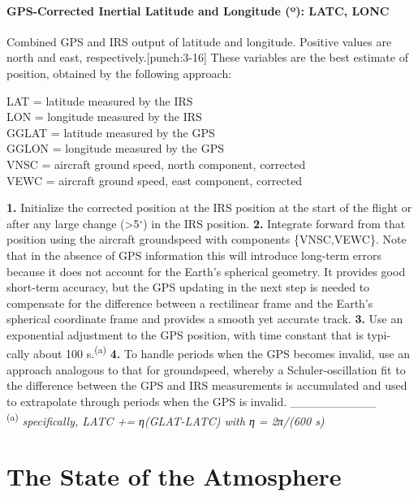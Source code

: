 \documentclass[
  english,
]{book}
\begin{document}
\hypertarget{latc-lonc}{%
\subsubsection*{\texorpdfstring{GPS-Corrected Inertial Latitude and Longitude ({º}): LATC, LONC}{GPS-Corrected Inertial Latitude and Longitude (º): LATC, LONC}}\label{latc-lonc}}

Combined GPS and IRS output of latitude and longitude. Positive values are north and east, respectively.\protect\hypertarget{punch:3-16}{}{{[}punch:3-16{]}} These variables are the best estimate of position, obtained by the following approach:

LAT = latitude measured by the IRS\\
LON = longitude measured by the IRS\\
GGLAT = latitude measured by the GPS\\
GGLON = longitude measured by the GPS\\
VNSC = aircraft ground speed, north component, corrected\\
VEWC = aircraft ground speed, east component, corrected

\textbf{1.} Initialize the corrected position at the IRS position at the start of the flight or after
any large change (\textgreater5\(^\circ\)) in the IRS position.
\textbf{2.} Integrate forward from that position using the aircraft groundspeed with components
\{VNSC,VEWC\}. Note that in the absence of GPS information this will introduce
long-term errors because it does not account for the Earth's spherical geometry. It
provides good short-term accuracy, but the GPS updating in the next step is needed to
compensate for the difference between a rectilinear frame and the Earth's spherical
coordinate frame and provides a smooth yet accurate track.
\textbf{3.} Use an exponential adjustment to the GPS position, with time constant that is typi-
cally about 100 s.\textsuperscript{(a)}
\textbf{4.} To handle periods when the GPS becomes invalid, use an approach analogous to that
for groundspeed, whereby a Schuler-oscillation fit to the difference between the GPS
and IRS measurements is accumulated and used to extrapolate through periods when
the GPS is invalid.
\_\_\_\_\_\_\_\_\_\_\\
\textsuperscript{(a)} \emph{specifically, LATC += η(GLAT-LATC) with η = 2π/(600 s)}

\hypertarget{the-state-of-the-atmosphere}{%
\chapter{The State of the Atmosphere}\label{the-state-of-the-atmosphere}}
\end{document}
